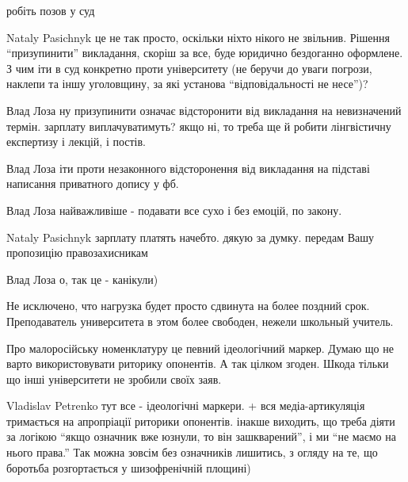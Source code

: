 \begin{itemize}

робіть позов у суд


Nataly Pasichnyk це не так просто, оскільки ніхто нікого не звільнив. Рішення
\enquote{призупинити} викладання, скоріш за все, буде юридично бездоганно оформлене. З
чим іти в суд конкретно проти університету (не беручи до уваги погрози, наклепи
та іншу уголовщину, за які установа \enquote{відповідальності не несе})?


Влад Лоза ну призупинити означає відсторонити від викладання на невизначений
термін. зарплату виплачуватимуть? якщо ні, то треба ще й робити лінгвістичну
експертизу і лекцій, і постів.


Влад Лоза іти проти незаконного відсторонення від викладання на підставі
написання приватного допису у фб.


Влад Лоза найважливіше - подавати все сухо і без емоцій, по закону.


Nataly Pasichnyk зарплату платять начебто. дякую за думку. передам Вашу пропозицію правозахисникам

Влад Лоза о, так це - канікули)


Не исключено, что нагрузка будет просто сдвинута на более поздний срок.
Преподаватель университета в этом более свободен, нежели школьный учитель.


Про малоросійську номенклатуру це певний ідеологічний маркер. Думаю що не варто
використовувати риторику опонентів. А так цілком згоден. Шкода тільки що інші
університети не зробили своїх заяв.


Vladislav Petrenko тут все - ідеологічні маркери. + вся медіа-артикуляція
тримається на апропріації риторики опонентів. інакше виходить, що треба діяти
за логікою \enquote{якщо означник вже юзнули, то він зашкварений}, і ми
\enquote{не маємо на нього права.} Так можна зовсім без означників лишитись, з
огляду на те, що боротьба розгортається у шизофренічній площині)



\end{itemize}
